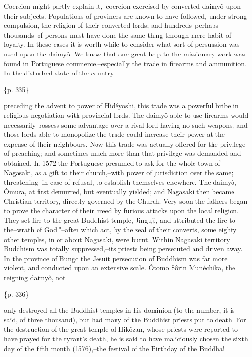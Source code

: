 Coercion might partly explain it,--coercion exercised by converted daimyô upon their subjects. Populations of provinces are known to have followed, under strong compulsion, the religion of their converted lords; and hundreds--perhaps thousands--of persons must have done the same thing through mere habit of loyalty. In these cases it is worth while to consider what sort of persuasion was used upon the daimyô. We know that one great help to the missionary work was found in Portuguese commerce,--especially the trade in firearms and ammunition. In the disturbed state of the country

\{p. 335\}

preceding the advent to power of Hidéyoshi, this trade was a powerful bribe in religious negotiation with provincial lords. The daimyô able to use firearms would necessarily possess some advantage over a rival lord having no such weapons; and those lords able to monopolize the trade could increase their power at the expense of their neighbours. Now this trade was actually offered for the privilege of preaching; and sometimes much more than that privilege was demanded and obtained. In 1572 the Portuguese presumed to ask for the whole town of Nagasaki, as a gift to their church,--with power of jurisdiction over the same; threatening, in case of refusal, to establish themselves elsewhere. The daimyô, Ômura, at first demurred, but eventually yielded; and Nagasaki then became Christian territory, directly governed by the Church. Very soon the fathers began to prove the character of their creed by furious attacks upon the local religion. They set fire to the great Buddhist temple, Jinguji, and attributed the fire to the--wrath of God,"--after which act, by the zeal of their converts, some eighty other temples, in or about Nagasaki, were burnt. Within Nagasaki territory Buddhism was totally suppressed,--its priests being persecuted and driven away. In the province of Bungo the Jesuit persecution of Buddhism was far more violent, and conducted upon an extensive scale. Ôtomo Sôrin Munéchika, the reigning daimyô, not

\{p. 336\}

only destroyed all the Buddhist temples in his dominion (to the number, it is said, of three thousand), but had many of the Buddhist priests put to death. For the destruction of the great temple of Hikôzan, whose priests were reported to have prayed for the tyrant's death, he is said to have maliciously chosen the sixth day of the fifth month (1576),--the festival of the Birthday of the Buddha!

